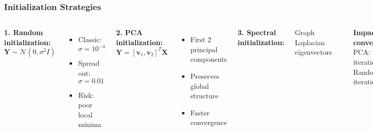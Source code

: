 \documentclass[aspectratio=169]{beamer}
\begin{document}
\begin{frame}
\frametitle{Initialization Strategies}
\begin{columns}[T]
\textbf{1. Random initialization:}
$$\mathbf{Y} \sim \mathcal{N}(0, \sigma^2 I)$$
\begin{itemize}
\small
\item Classic: $\sigma = 10^{-4}$
\item Spread out: $\sigma = 0.01$
\item Risk: poor local minima
\end{itemize}

\vspace{0.3cm}
\textbf{2. PCA initialization:}
$$\mathbf{Y} = [\mathbf{v}_1, \mathbf{v}_2]^T \mathbf{X}$$
\begin{itemize}
\small
\item First 2 principal components
\item Preserves global structure
\item Faster convergence
\end{itemize}

\textbf{3. Spectral initialization:}

Graph Laplacian eigenvectors

\vspace{0.3cm}
\begin{center}
\end{center}

\textbf{Impact on convergence:}\\
\small PCA: 500 iterations\\
Random: 1000 iterations
\end{columns}
\end{frame}
\end{document}

